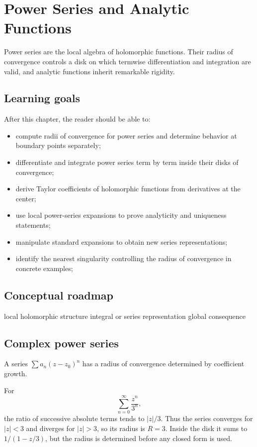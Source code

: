 \chapter{Power Series and Analytic Functions}
\label{ch:iv03}

Power series are the local algebra of holomorphic functions. Their radius of convergence controls a disk on which termwise differentiation and integration are valid, and analytic functions inherit remarkable rigidity.

\section*{Learning goals}
After this chapter, the reader should be able to:
\begin{itemize}
\item compute radii of convergence for power series and determine behavior at boundary points separately;
\item differentiate and integrate power series term by term inside their disks of convergence;
\item derive Taylor coefficients of holomorphic functions from derivatives at the center;
\item use local power-series expansions to prove analyticity and uniqueness statements;
\item manipulate standard expansions to obtain new series representations;
\item identify the nearest singularity controlling the radius of convergence in concrete examples;
\end{itemize}
\section*{Conceptual roadmap}
\volroadmap
  {local holomorphic structure}
  {integral or series representation}
  {global consequence}

\section{Complex power series}
A series $\sum a_n(z-z_0)^n$ has a radius of convergence determined by coefficient growth.

\begin{example}\label{ex:iv03-expand-01}
For
\[
\sum_{n=0}^{\infty}\frac{z^n}{3^n},
\]
the ratio of successive absolute terms tends to \(|z|/3\). Thus the series converges for \(|z|<3\) and diverges for \(|z|>3\), so its radius is \(R=3\). Inside the disk it sums to \(1/(1-z/3)\), but the radius is determined before any closed form is used.
\end{example}
